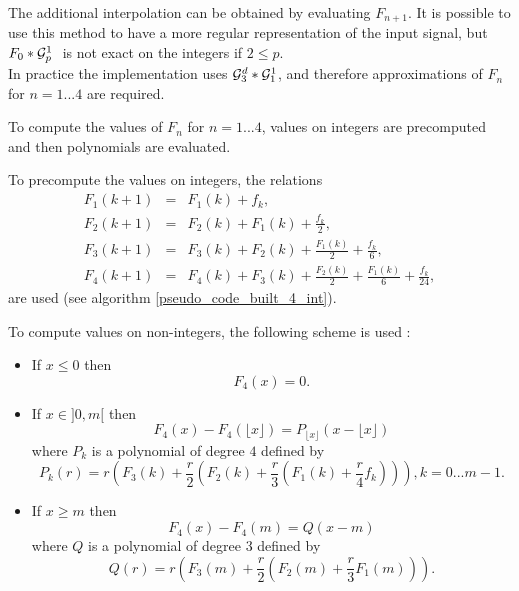 The additional interpolation can be obtained by evaluating $F_{n+1}$.
It is possible to use this method to have a more regular representation of the input signal, but $F_0 * \mathcal{G}_p^1~$ is not exact on the integers if $2\le p$.\\
In practice the implementation uses $\mathcal{G}_3^d * \mathcal{G}_1^1$, and therefore approximations of $F_n$ for $n=1...4$ are required.



To compute the values of $F_n$ for $n=1...4$, values on integers are precomputed and then polynomials are evaluated.


To precompute the values on integers, the relations
\begin{eqnarray}
F_{1}(k+1)&=&  F_{1}(k)+f_{k}, \label{formula_discret_integral_1}\\
F_{2}(k+1)&=&  F_{2}(k)+F_{1}(k)+\frac{f_{k}}{2}, \label{formula_discret_integral_2}\\
F_{3}(k+1)&=&  F_{3}(k)+F_{2}(k)+\frac{F_{1}(k)}{2}+\frac{f_{k}}{6}, \label{formula_discret_integral_3}\\
F_{4}(k+1)&=&  F_{4}(k)+F_{3}(k)+\frac{F_{2}(k)}{2}+\frac{F_{1}(k)}{6}+\frac{f_{k}}{24}, \label{formula_discret_integral_4}
\end{eqnarray}
are used (see algorithm \ref{pseudo_code_built_4_int}).



To compute values on non-integers, the following scheme is used :

\begin{itemize}
\item If $x\le 0$ then
\begin{equation}
\label{formula_nonint_integral_case1}
F_{4}(x)=0.
\end{equation}
\item If $x\in ]0 , m[$ then
\begin{equation}
\label{formula_nonint_integral_case2}
F_{4}(x)-F_{4}(\lfloor x \rfloor)=P_{\lfloor x \rfloor}(x-\lfloor x \rfloor)
\end{equation}
where $P_k$ is a polynomial of degree $4$ defined by
\begin{equation*}
P_k (r) =r \left( F_{3}(k) +\frac{r}{2} \left(F_{2}(k)+ \frac{r}{3}\left(F_{1}(k)+\frac{r}{4} f_{k}\right)\right)\right), k=0...m-1.
\end{equation*}
\item If $x\ge m$ then
\begin{equation}
\label{formula_nonint_integral_case3}
F_{4}(x)-F_{4}(m)=Q(x-m)
\end{equation}
where  $Q$ is a polynomial of degree 3 defined by
\begin{equation*}
Q(r)=r \left(F_{3}(m)+\frac{r}{2} \left( F_{2}(m) + \frac{r}{3} F_1 (m)\right)\right).
\end{equation*}\
\end{itemize}

